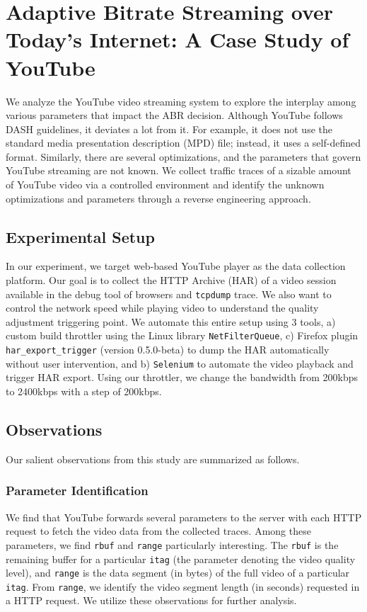 \section{Adaptive Bitrate Streaming over Today’s Internet: A Case Study of YouTube}
We analyze the YouTube video streaming system to explore the interplay among various parameters that impact the ABR decision. Although YouTube follows DASH guidelines, it deviates a lot from it. For example, it does not use the standard media presentation description (MPD) file; instead, it uses a self-defined format. Similarly, there are several optimizations, and the parameters that govern YouTube streaming are not known. We collect traffic traces of a sizable amount of YouTube video via a controlled environment and identify the unknown optimizations and parameters through a reverse engineering approach.
\subsection{Experimental Setup}
In our experiment, we target web-based YouTube player as the data collection platform. Our goal is to collect the HTTP Archive (HAR) of a video session available in the debug tool of browsers and {\tt tcpdump} trace. We also want to control the network speed while playing video to understand the quality adjustment triggering point. We automate this entire setup using 3 tools, a) custom build throttler using the Linux library {\tt NetFilterQueue}, c) Firefox plugin {\tt har\_export\_trigger} (version 0.5.0-beta) to dump the HAR automatically without user intervention, and b) {\tt Selenium} to automate the video playback and trigger HAR export. Using our throttler, we change the bandwidth from 200kbps to 2400kbps with a step of 200kbps.
\subsection{Observations}
Our salient observations from this study are summarized as follows. 
\subsubsection{Parameter Identification}
We find that YouTube forwards several parameters to the server with each HTTP request to fetch the video data from the collected traces. Among these parameters, we find {\tt rbuf} and {\tt range} particularly interesting. The {\tt rbuf} is the remaining buffer for a particular {\tt itag} (the parameter denoting the video quality level), and {\tt range} is the data segment (in bytes) of the full video of a particular {\tt itag}. From {\tt range},  we identify the video segment length (in seconds) requested in a HTTP request. We utilize these observations for further analysis.
